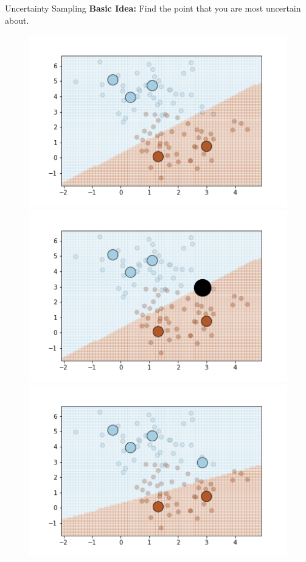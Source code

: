 \documentclass{beamer}
\begin{document}
\begin{frame}{Uncertainty Sampling}
\vspace{0.6cm}
\textbf{Basic Idea:} Find the point that you are most uncertain about.
\vspace{-0.6cm}
\begin{figure}
\begin{overprint}
 \includegraphics[width=\textwidth]{active/un_1.png}
 \includegraphics[width=\textwidth]{active/un_2.png}
 \includegraphics[width=\textwidth]{active/un_3.png}
\end{overprint}
\end{figure}
\end{frame}
\end{document}
